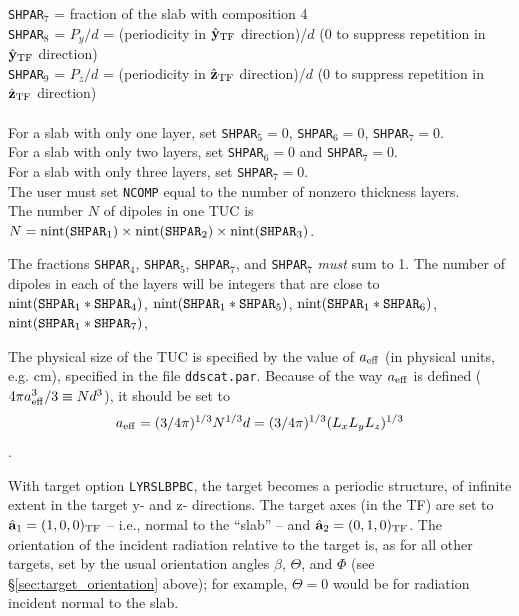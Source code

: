 	{\tt SHPAR}$_7$ = fraction of the slab with composition 4\\
	{\tt SHPAR}$_8$ = $P_y/d$ = (periodicity in $\hat{\bf y}_{\rm TF}$ direction)/$d$
             (0 to suppress repetition in $\hat{\bf y}_{\rm TF}$ direction)\\
	{\tt SHPAR}$_9$ = $P_z/d$ = (periodicity in $\hat{\bf z}_{\rm TF}$ direction)/$d$
             (0 to suppress repetition in $\hat{\bf z}_{\rm TF}$ direction)\\
	\ \\
	For a slab with only one layer, set {\tt SHPAR}$_5=0$,
	{\tt SHPAR}$_6=0$, {\tt SHPAR}$_7=0$.\\
	For a slab with only two layers, set {\tt SHPAR}$_6=0$ and
	{\tt SHPAR}$_7=0$.\\
	For a slab with only three layers, set {\tt SHPAR}$_7=0$.\\
	The user must set {\tt NCOMP} equal to
	the number of nonzero thickness layers.\\
	The number $N$ of dipoles in one TUC is
	$N={\rm nint}({\tt SHPAR}_1)\times{\rm nint}({\tt SHPAR}_2)\times
	{\rm nint}({\tt SHPAR}_3)$.
	
	The fractions {\tt SHPAR$_4$}, {\tt SHPAR}$_5$, {\tt SHPAR}$_7$,
	and {\tt SHPAR}$_7$ {\it must} sum to 1.
	The number of dipoles in each of the layers will be integers
	that are close to ${\rm  nint}({\tt SHPAR}_1*{\tt SHPAR}_4)$, 
	${\rm  nint}({\tt SHPAR}_1*{\tt SHPAR}_5)$, 
	${\rm  nint}({\tt SHPAR}_1*{\tt SHPAR}_6)$, 
	${\rm  nint}({\tt SHPAR}_1*{\tt SHPAR}_7)$, 

	The physical size of the TUC is specified by the value of
	${a}_{\rm eff}$ (in physical units, e.g. cm), 
	specified in the file {\tt ddscat.par}.  Because of the way
	${a}_{\rm eff}$ is defined 
	($4\pi {a}_{\rm eff}^3/3 \equiv Nd^3$),
	it should be set to
	$$ {a}_{\rm eff} = (3/4\pi)^{1/3} N^{1/3} d = (3/4\pi)^{1/3}
	(L_x L_y L_z)^{1/3}$$.

	With target option {\tt LYRSLBPBC}, the target
	becomes a periodic structure, of infinite extent in the target
	y- and z- directions.
	The target axes (in the TF) 
	are set to ${\hat{\bf a}}_1 = (1,0,0)_{\rm TF}$ --
	i.e., normal to the ``slab'' -- and
	${\hat{\bf a}}_2 = (0,1,0)_{\rm TF}$.
	The orientation of the incident radiation relative to the target
	is, as for all other targets, set by the usual orientation
	angles $\beta$, $\Theta$, and $\Phi$ 
	(see \S\ref{sec:target_orientation} above); for example,
	$\Theta=0$ would be for radiation incident normal to the slab.

